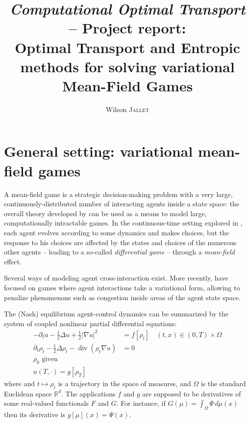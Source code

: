 \documentclass{article}
\author{Wilson \textsc{Jallet}}
\title{
	{\large\textit{Computational Optimal Transport} -- \textsf{Project report:}}\\
Optimal Transport and Entropic methods for solving variational Mean-Field Games}
\newcommand{\RR}{\mathbb{R}}
\DeclareMathOperator{\divg}{div}
\begin{document}
    \maketitle
    
    
    \section{General setting: variational mean-field games}
    
    A mean-field game \cite{LASRY2006619,LASRY2006679} is a strategic decision-making problem with a very large, continuously-distributed number of interacting agents inside a state space: the overall theory developed by \citeauthor{LASRY2006619} can be used as a means to model large, computationally intractable games. In the continuous-time setting explored in \cite{LASRY2006679}, each agent evolves according to some dynamics and makes choices, but the response to his choices are affected by the states and choices of the numerous other agents -- leading to a so-called \textit{differential game} -- through a \textit{mean-field} effect.
    
    Several ways of modeling agent cross-interaction exist. More recently, \cite{benamou:hal-01295299} have focused on games where agent interactions take a variational form, allowing to penalize phenomenons such as congestion inside areas of the agent state space.
    
    
    The (Nash) equilibrium agent-control dynamics can be summarized by the system of coupled nonlinear partial differential equations:
    \begin{subequations}\label{eq:VariationalQuadraticMFG}
    \begin{align}\label{eq:VarQuadMFGHJB}
    -\partial_t u - \frac{1}{2}\Delta u + \frac12|\nabla u|^2 &= f[\rho_t] \quad (t,x) \in  (0, T) \times \Omega \\\label{eq:VarQuadMFGKolmo}
    \partial_t \rho_t - \frac{1}{2}\Delta\rho_t - \divg(\rho_t \nabla u) &= 0 \\
    \rho_0 \text{ given} \\
    u(T, \cdot) = g[\rho_T]
    \end{align}	
    \end{subequations}
    where and $t\mapsto \rho_t$ is a trajectory in the space of measures, and $\Omega$ is the standard Euclidean space $\RR^d$. The applications $f$ and $g$ are supposed to be derivatives of some real-valued functionals $F$ and $G$. For instance, if $G(\mu) = \int_\Omega \Psi\,d\mu(x)$ then its derivative is $g[\mu](x) = \Psi(x)$.
    
\end{document}
